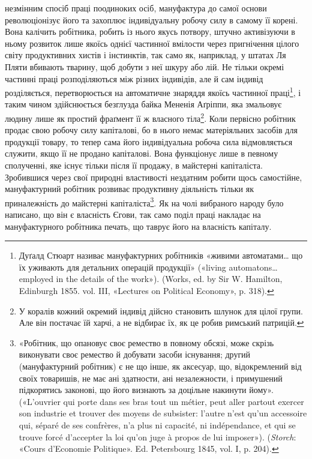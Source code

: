 \parcont{}  %
незмінним спосіб праці поодиноких осіб, мануфактура до самої
основи революціонізує його та захоплює індивідуальну робочу
силу в самому її корені. Вона калічить робітника, робить із нього
якусь потвору, штучно активізуючи в ньому розвиток лише
якоїсь однієї частинної вмілости через пригнічення цілого світу
продуктивних хистів і інстинктів, так само як, наприклад, у
штатах Ля Пляти вбивають тварину, щоб добути з неї шкуру
або лій. Не тільки окремі частинні праці розподіляються між
різних індивідів, але й сам індивід розділяється, перетворюється
на автоматичне знаряддя якоїсь частинної праці\footnote{
Дуґалд Стюарт називає мануфактурних робітників «живими
автоматами\dots{} що їх уживають для детальних операцій продукції» («living
automatons\dots{} employed in the details of the work»). (Works, ed. by Sir
W. Hamilton, Edinburgh 1855. vol. III, «Lectures on Political Economy»,
p. 318).
}, і таким чином
здійснюється безглузда байка Мененія Аґріппи, яка змальовує
людину лише як простий фраґмент її ж власного тіла\footnote{
У коралів кожний окремий індивід дійсно становить шлунок
для цілої групи. Але він постачає їй харчі, а не відбирає їх, як це робив
римський патрицій.
}. Коли первісно робітник продає свою робочу силу капіталові, бо в нього
немає матеріяльних засобів для продукції товару, то тепер сама
його індивідуальна робоча сила відмовляється служити, якщо
її не продано капіталові. Вона функціонує лише в певному сполученні,
яке існує тільки після її продажу, в майстерні капіталіста.
Зробившися через свої природні властивості нездатним робити
щось самостійне, мануфактурний робітник розвиває продуктивну
діяльність тільки як приналежність до майстерні капіталіста\footnote{
«Робітник, що опановує своє ремество в повному обсязі, може
скрізь виконувати своє ремество й добувати засоби існування; другий
(мануфактурний робітник) є не що інше, як аксесуар, що, відокремлений
від своїх товаришів, не має ані здатности, ані незалежности,
і примушений підкорятись законові, що його визнають за доцільне
накинути йому». («L’ouvrier qui porte dans ses bras tout un métier, peut
aller partout exercer son industrie et trouver des moyens de subsister: l’autre
n’est qu’un accessoire qui, séparé de ses confrères, n'a plus ni capacité,
ni indépendance, et qui se trouve forcé d’accepter la loi qu’on juge à
propos de lui imposer»). (\emph{Storch}: «Cours d’Economie Politique». Ed.
Petersbourg 1845, vol. I, p. 204).
}. Як на чолі вибраного народу було написано, що він є власність
Єгови, так само поділ праці накладає на мануфактурного робітника
печать, що таврує його на власність капіталу.

